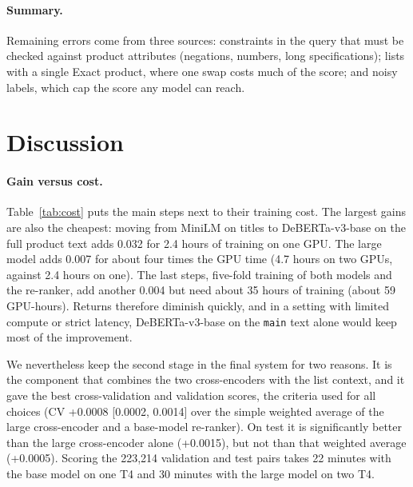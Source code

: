\documentclass[12pt,a4paper]{report}
\begin{document}
\paragraph{Summary.} Remaining errors come from three sources: constraints in the query that must be checked against product attributes (negations, numbers, long specifications); lists with a single Exact product, where one swap costs much of the score; and noisy labels, which cap the score any model can reach.

\section{Discussion}\label{sec:discussion}
\paragraph{Gain versus cost.} Table~\ref{tab:cost} puts the main steps next to their training cost. The largest gains are also the cheapest: moving from MiniLM on titles to DeBERTa-v3-base on the full product text adds 0.032 for 2.4 hours of training on one GPU. The large model adds 0.007 for about four times the GPU time (4.7 hours on two GPUs, against 2.4 hours on one). The last steps, five-fold training of both models and the re-ranker, add another 0.004 but need about 35 hours of training (about 59 GPU-hours). Returns therefore diminish quickly, and in a setting with limited compute or strict latency, DeBERTa-v3-base on the \texttt{main} text alone would keep most of the improvement.

We nevertheless keep the second stage in the final system for two reasons. It is the component that combines the two cross-encoders with the list context, and it gave the best cross-validation and validation scores, the criteria used for all choices (CV +0.0008 [0.0002, 0.0014] over the simple weighted average of the large cross-encoder and a base-model re-ranker). On test it is significantly better than the large cross-encoder alone (+0.0015), but not than that weighted average (+0.0005). Scoring the 223,214 validation and test pairs takes 22 minutes with the base model on one T4 and 30 minutes with the large model on two T4.
\end{document}
